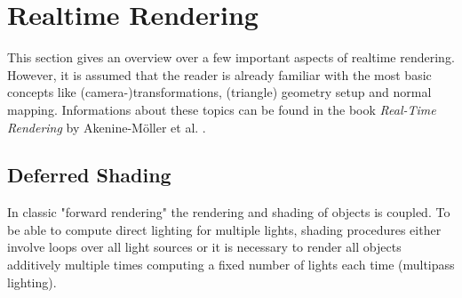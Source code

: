 \documentclass[thesis.tex]{subfiles}
\begin{document}
\section{Realtime Rendering}
This section gives an overview over a few important aspects of realtime rendering.
However, it is assumed that the reader is already familiar with the most basic concepts like (camera-)transformations, (triangle) geometry setup and normal mapping.
Informations about these topics can be found in the book \emph{Real-Time Rendering} by Akenine-M\"{o}ller et al. \cite{bib:RealtimeRenderingBook}. %


\subsection{Deferred Shading}
In classic "forward rendering" the rendering and shading of objects is coupled.
To be able to compute direct lighting for multiple lights, shading procedures either involve loops over all light sources or it is necessary to render all objects additively multiple times computing a fixed number of lights each time (multipass lighting).
\end{document}
